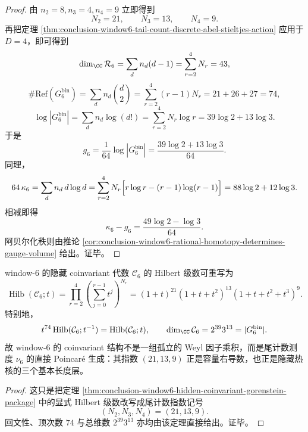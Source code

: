 \begin{proof}
由 \(n_2=8,n_3=4,n_4=9\) 立即得到
\[
N_2=21,\qquad N_3=13,\qquad N_4=9.
\]
再把定理 \ref{thm:conclusion-window6-tail-count-discrete-abel-stieltjes-action} 应用于 \(D=4\)，即可得到
\[
\dim_{\CC}\mathcal R_6=\sum_d n_d(d-1)=\sum_{r=2}^{4}N_r=43,
\]
\[
\#\mathrm{Ref}(G_6^{\mathrm{bin}})
=
\sum_d n_d\binom d2
=
\sum_{r=2}^{4}(r-1)N_r
=21+26+27=74,
\]
\[
\log|G_6^{\mathrm{bin}}|
=
\sum_d n_d\log(d!)
=
\sum_{r=2}^{4}N_r\log r
=39\log 2+13\log 3.
\]
于是
\[
g_6=\frac{1}{64}\log|G_6^{\mathrm{bin}}|
=
\frac{39\log 2+13\log 3}{64}.
\]
同理，
\[
64\,\kappa_6
=
\sum_d n_d\,d\log d
=
\sum_{r=2}^{4}N_r\Bigl[r\log r-(r-1)\log(r-1)\Bigr]
=88\log 2+12\log 3.
\]
相减即得
\[
\kappa_6-g_6=\frac{49\log 2-\log 3}{64}.
\]
阿贝尔化秩则由推论 \ref{cor:conclusion-window6-rational-homotopy-determines-gauge-volume} 给出。证毕。
\end{proof}

\begin{corollary}\label{cor:conclusion-window6-coinvariant-poincare-package-generated-by-tail-measure}
window-\(6\) 的隐藏 coinvariant 代数 \(\mathcal C_6\) 的 Hilbert 级数可重写为
\[
\operatorname{Hilb}(\mathcal C_6;t)
=
\prod_{r=2}^{4}\left(\sum_{j=0}^{r-1}t^j\right)^{N_r}
=
(1+t)^{21}(1+t+t^2)^{13}(1+t+t^2+t^3)^{9}.
\]
特别地，
\[
t^{74}\operatorname{Hilb}(\mathcal C_6;t^{-1})
=
\operatorname{Hilb}(\mathcal C_6;t),
\qquad
\dim_{\CC}\mathcal C_6=2^{39}3^{13}=|G_6^{\mathrm{bin}}|.
\]
故 window-\(6\) 的 coinvariant 结构不是一组孤立的 Weyl 因子乘积，而是尾计数测度 \(\nu_6\) 的直接 Poincar\'e 生成：其指数 \((21,13,9)\) 正是容量右导数，也正是隐藏热核的三个基本长度层。
\end{corollary}

\begin{proof}
这只是把定理 \ref{thm:conclusion-window6-hidden-coinvariant-gorenstein-package} 中的显式 Hilbert 级数改写成尾计数指数记号
\[
(N_2,N_3,N_4)=(21,13,9).
\]
回文性、顶次数 \(74\) 与总维数 \(2^{39}3^{13}\) 亦均由该定理直接给出。证毕。
\end{proof}


